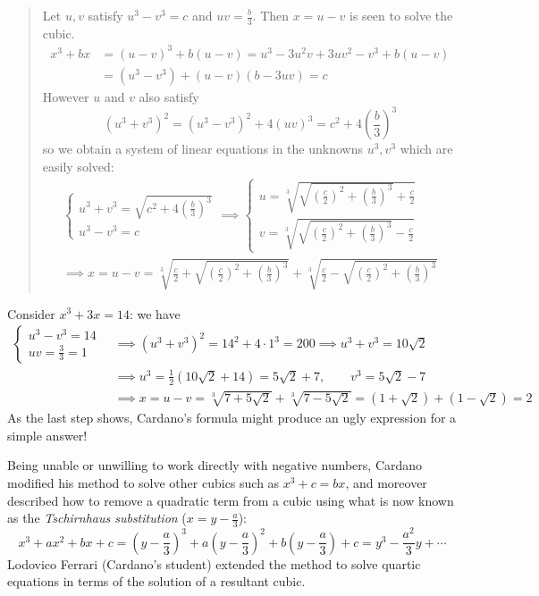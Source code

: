 \begin{quote}
Let $u,v$ satisfy $u^3-v^3=c$ and $uv=\frac{b}{3}$.
Then $x=u-v$ is seen to solve the cubic.
\begin{align*}
x^3+bx&=(u-v)^3+b(u-v)=u^3-3u^2v+3uv^2-v^3+b(u-v)\\
&=(u^3-v^3)+(u-v)(b-3uv)=c
\end{align*}
However $u$ and $v$ also satisfy
\[(u^3+v^3)^2=(u^3-v^3)^2+4(uv)^3=c^2+4\left(\frac{b}{3}\right)^3\]
so we obtain a system of linear equations in the unknowns $u^3,v^3$ which are easily solved:
\begin{gather*}\begin{cases}
	u^3+v^3=\sqrt{c^2+4\left(\frac{b}{3}\right)^3}\\
	u^3-v^3=c
	\end{cases} \implies \begin{cases}
	u=\sqrt[3]{\sqrt{\left(\frac c2\right)^2+\left(\frac{b}{3}\right)^3}+\frac c2}\\
	v=\sqrt[3]{\sqrt{\left(\frac c2\right)^2+\left(\frac{b}{3}\right)^3}-\frac c2}
	\end{cases}\\
	\implies x=u-v=\sqrt[3]{\frac c2+\sqrt{\left(\frac c2\right)^2+\left(\frac{b}{3}\right)^3}}+\sqrt[3]{\frac c2-\sqrt{\left(\frac c2\right)^2+\left(\frac{b}{3}\right)^3}}
\end{gather*}
\end{quote}


Consider $x^3+3x=14$: we have
\begin{align*}
\begin{cases}
u^3-v^3=14\\
uv=\frac 33=1
\end{cases}\ &\implies (u^3+v^3)^2=14^2+4\cdot 1^3=200 \implies u^3+v^3=10\sqrt 2\\
&\implies u^3=\frac 12(10\sqrt 2+14)=5\sqrt 2+7,\qquad v^3=5\sqrt 2-7\\
&\implies x=u-v=\sqrt[3]{7+5\sqrt 2}+\sqrt[3]{7-5\sqrt 2} =(1+\sqrt 2)+(1-\sqrt 2)=2
\end{align*}
As the last step shows, Cardano's formula might produce an ugly expression for a simple answer!

\goodbreak

Being unable or unwilling to work directly with negative numbers, Cardano modified his method to solve other cubics such as $x^3+c=bx$, and moreover described how to remove a quadratic term from a cubic using what is now known as the \emph{Tschirnhaus substitution} ($x=y-\frac a3$):
\[x^3+ax^2+bx+c =\left(y-\frac a3\right)^3+a\left(y-\frac a3\right)^2+b\left(y-\frac a3\right)+c =y^3-\frac{a^2}3y+\cdots \tag{$\ast$}\]
Lodovico Ferrari (Cardano's student) extended the method to solve quartic equations in terms of the solution of a resultant cubic.


